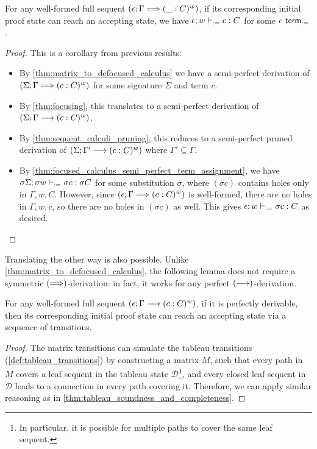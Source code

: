 \documentclass[twoside]{report}
\begin{document}
\begin{proposition}[Soundness]
\label{thm:matrix_soundness}
For any well-formed full sequent $(\epsilon; \Gamma \Longrightarrow (\_ : C)^w)$, if its corresponding initial proof state can reach an accepting state, we have $\epsilon; w \vdash_{:=} c : C$ for some $c \ \mathsf{term}_{:=}$.
\end{proposition}

\begin{proof}
This is a corollary from previous results:
\begin{itemize}
    \item By \cref{thm:matrix_to_defocused_calculus} we have a semi-perfect derivation of $(\Sigma; \Gamma \Longrightarrow (c : C)^w)$ for some signature $\Sigma$ and term $c$.
    \item By \cref{thm:focusing}, this translates to a semi-perfect derivation of $(\Sigma; \Gamma \longrightarrow (c : C)^w)$.
    \item By \cref{thm:sequent_calculi_pruning}, this reduces to a semi-perfect pruned derivation of $(\Sigma; \Gamma' \longrightarrow (c : C)^w)$ where $\Gamma' \subseteq \Gamma$.
    \item By \cref{thm:focused_calculus_semi_perfect_term_assignment}, we have $\sigma \Sigma; \sigma w \vdash_{:=} \sigma c : \sigma C$ for some substitution $\sigma$, where $(\sigma c)$ contains holes only in $\Gamma, w, C$. However, since $(\epsilon; \Gamma \Longrightarrow (c : C)^w)$ is well-formed, there are no holes in $\Gamma, w, c$, so there are no holes in $(\sigma c)$ as well. This gives $\epsilon; w \vdash_{:=} \sigma c : C$ as desired. \qedhere
\end{itemize}
\end{proof}

Translating the other way is also possible. Unlike \cref{thm:matrix_to_defocused_calculus}, the following lemma does not require a symmetric $(\Longrightarrow)$-derivation: in fact, it works for any perfect $(\longrightarrow)$-derivation.

\begin{proposition}[Simulation]
\label{thm:focused_calculus_to_matrix}
For any well-formed full sequent $(\epsilon; \Gamma \longrightarrow (c : C)^w)$, if it is perfectly derivable, then its corresponding initial proof state can reach an accepting state via a sequence of transitions.
\end{proposition}

\begin{proof}
The matrix transitions can simulate the tableau transitions (\cref{def:tableau_transitions}) by constructing a matrix $M$, such that every path in $M$ covers a leaf sequent in the tableau state $\mathcal D$\footnote{In particular, it is possible for multiple paths to cover the same leaf sequent.}, and every closed leaf sequent in $\mathcal D$ leads to a connection in every path covering it. Therefore, we can apply similar reasoning as in \cref{thm:tableau_soundness_and_completeness}.
\end{proof}
\end{document}
